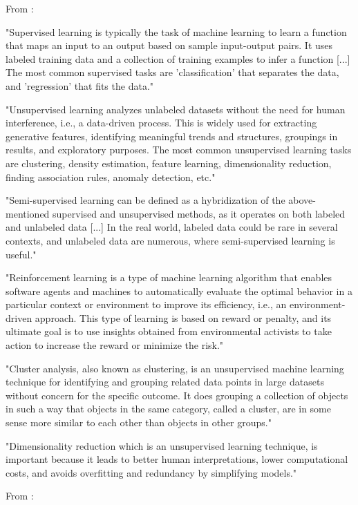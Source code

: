 From \parencite{sarker2021machine_learning_algorithms_real_world_applications_research_directions} :

"Supervised learning is typically the task of machine learning to learn a function that maps an input to an output based on sample input-output pairs. It uses labeled training data and a collection of training examples to infer a function [...] The most common supervised tasks are 'classification' that separates the data, and 'regression' that fits the data."

"Unsupervised learning analyzes unlabeled datasets without the need for human interference, i.e., a data-driven process. This is widely used for extracting generative features, identifying meaningful trends and structures, groupings in results, and exploratory purposes. The most common unsupervised learning tasks are clustering, density estimation, feature learning, dimensionality reduction, finding association rules, anomaly detection, etc."

"Semi-supervised learning can be defined as a hybridization of the above-mentioned supervised and unsupervised methods, as it operates on both labeled and unlabeled data [...] In the real world, labeled data could be rare in several contexts, and unlabeled data are numerous, where semi-supervised learning is useful."

"Reinforcement learning is a type of machine learning algorithm that enables software agents and machines to automatically evaluate the optimal behavior in a particular context or environment to improve its efficiency, i.e., an environment-driven approach. This type of learning is based on reward or penalty, and its ultimate goal is to use insights obtained from environmental activists to take action to increase the reward or minimize the risk."

"Cluster analysis, also known as clustering, is an unsupervised machine learning technique for identifying and grouping related data points in large datasets without concern for the specific outcome. It does grouping a collection of objects in such a way that objects in the same category, called a cluster, are in some sense more similar to each other than objects in other groups."

"Dimensionality reduction which is an unsupervised learning technique, is important because it leads to better human interpretations, lower computational costs, and avoids overfitting and redundancy by simplifying models."

From \parencite[p.~3]{bishop2006pattern_recognition_machine_learning} :

